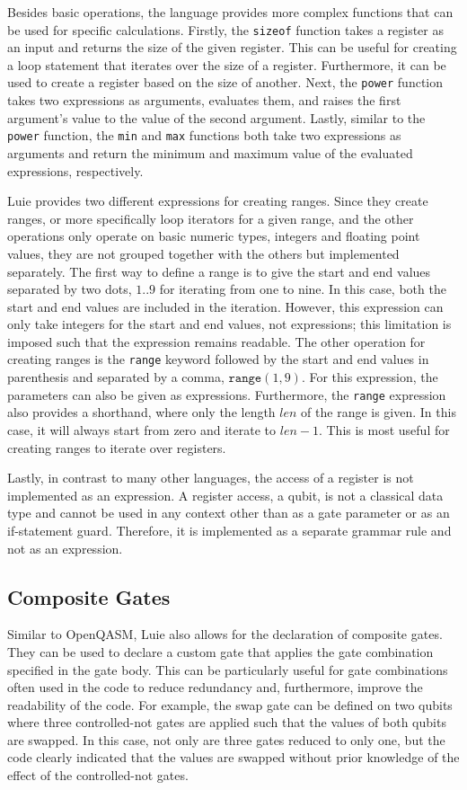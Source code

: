 Besides basic operations, the language provides more complex functions that can be used for specific calculations. Firstly, the \texttt{sizeof} function takes a register as an input and returns the size of the given register. This can be useful for creating a loop statement that iterates over the size of a register. Furthermore, it can be used to create a register based on the size of another. Next, the \texttt{power} function takes two expressions as arguments, evaluates them, and raises the first argument's value to the value of the second argument. Lastly, similar to the \texttt{power} function, the \texttt{min} and \texttt{max} functions both take two expressions as arguments and return the minimum and maximum value of the evaluated expressions, respectively.

Luie provides two different expressions for creating ranges. Since they create ranges, or more specifically loop iterators for a given range, and the other operations only operate on basic numeric types, \eg integers and floating point values, they are not grouped together with the others but implemented separately. The first way to define a range is to give the start and end values separated by two dots, \eg $1\texttt{..}9$ for iterating from one to nine. In this case, both the start and end values are included in the iteration. However, this expression can only take integers for the start and end values, not expressions; this limitation is imposed such that the expression remains readable. The other operation for creating ranges is the \texttt{range} keyword followed by the start and end values in parenthesis and separated by a comma, \eg $\texttt{range}(1, 9)$. For this expression, the parameters can also be given as expressions. Furthermore, the \texttt{range} expression also provides a shorthand, where only the length $len$ of the range is given. In this case, it will always start from zero and iterate to $len - 1$. This is most useful for creating ranges to iterate over registers. 

Lastly, in contrast to many other languages, the access of a register is not implemented as an expression. A register access, \ie a qubit, is not a classical data type and cannot be used in any context other than as a gate parameter or as an if-statement guard. Therefore, it is implemented as a separate grammar rule and not as an expression.

\subsection{Composite Gates}
\label{sec:concept_compositeGates}
Similar to OpenQASM, Luie also allows for the declaration of composite gates. They can be used to declare a custom gate that applies the gate combination specified in the gate body. This can be particularly useful for gate combinations often used in the code to reduce redundancy and, furthermore, improve the readability of the code. For example, the swap gate can be defined on two qubits where three controlled-not gates are applied such that the values of both qubits are swapped. In this case, not only are three gates reduced to only one, but the code clearly indicated that the values are swapped without prior knowledge of the effect of the controlled-not gates.

